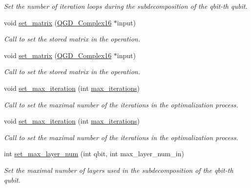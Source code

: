 \begin{DoxyCompactItemize}
\begin{DoxyCompactList}\small\item\em Set the number of iteration loops during the subdecomposition of the qbit-\/th qubit. \end{DoxyCompactList}\item 
void \hyperlink{class_operation_a026d3dcf0ad00af99c7a9097d3cf1c74}{set\+\_\+matrix} (\hyperlink{struct_q_g_d___complex16}{Q\+G\+D\+\_\+\+Complex16} $\ast$input)
\begin{DoxyCompactList}\small\item\em Call to set the stored matrix in the operation. \end{DoxyCompactList}\item 
void \hyperlink{class_operation_a026d3dcf0ad00af99c7a9097d3cf1c74}{set\+\_\+matrix} (\hyperlink{struct_q_g_d___complex16}{Q\+G\+D\+\_\+\+Complex16} $\ast$input)
\begin{DoxyCompactList}\small\item\em Call to set the stored matrix in the operation. \end{DoxyCompactList}\item 
void \hyperlink{class_decomposition___base_a26e98bca148157ec42e5f1618deb50ea}{set\+\_\+max\+\_\+iteration} (int \hyperlink{class_decomposition___base_a89e74f075626c21e23228772bf8ad395}{max\+\_\+iterations})
\begin{DoxyCompactList}\small\item\em Call to set the maximal number of the iterations in the optimalization process. \end{DoxyCompactList}\item 
void \hyperlink{class_decomposition___base_a26e98bca148157ec42e5f1618deb50ea}{set\+\_\+max\+\_\+iteration} (int \hyperlink{class_decomposition___base_a89e74f075626c21e23228772bf8ad395}{max\+\_\+iterations})
\begin{DoxyCompactList}\small\item\em Call to set the maximal number of the iterations in the optimalization process. \end{DoxyCompactList}\item 
int \hyperlink{class_decomposition___base_a6cbee8cd37f42b2fe6bdd6f5c0fd3fdb}{set\+\_\+max\+\_\+layer\+\_\+num} (int qbit, int max\+\_\+layer\+\_\+num\+\_\+in)
\begin{DoxyCompactList}\small\item\em Set the maximal number of layers used in the subdecomposition of the qbit-\/th qubit. \end{DoxyCompactList}\item 

\end{DoxyCompactItemize}
